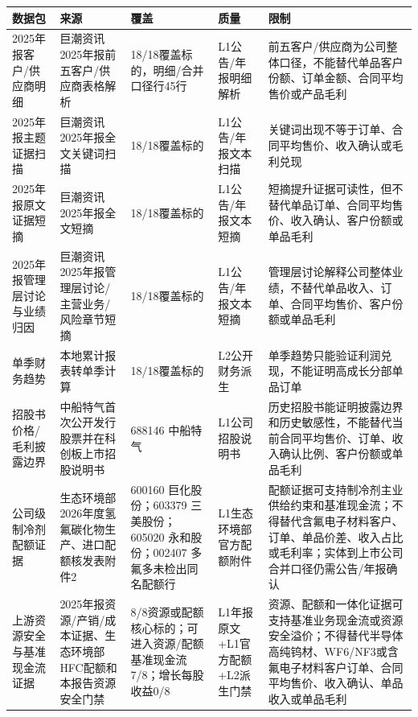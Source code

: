 \begin{exhibitbox}[结构化数据源健康（7）]
\scriptsize
\begin{tabularx}{\exhibitboxwidth}{L{2.1cm} L{2.4cm} L{2.4cm} L{1.5cm} X}
\toprule
\textbf{数据包} & \textbf{来源} & \textbf{覆盖} & \textbf{质量} & \textbf{限制} \\
\midrule
2025年报客户/供应商明细 & 巨潮资讯2025年报前五客户/供应商表格解析 & 18/18覆盖标的，明细/合并口径行45行 & L1公告/年报明细解析 & 前五客户/供应商为公司整体口径，不能替代单品客户份额、订单金额、合同平均售价或产品毛利 \\
2025年报主题证据扫描 & 巨潮资讯2025年报全文关键词扫描 & 18/18覆盖标的 & L1公告/年报文本扫描 & 关键词出现不等于订单、合同平均售价、收入确认或毛利兑现 \\
2025年报原文证据短摘 & 巨潮资讯2025年报全文短摘 & 18/18覆盖标的 & L1公告/年报文本短摘 & 短摘提升证据可读性，但不替代单品订单、合同平均售价、收入确认、客户份额或单品毛利 \\
2025年报管理层讨论与业绩归因 & 巨潮资讯2025年报管理层讨论/主营业务/风险章节短摘 & 18/18覆盖标的 & L1公告/年报文本短摘 & 管理层讨论解释公司整体业绩，不替代单品收入、订单、合同平均售价、客户份额或单品毛利 \\
单季财务趋势 & 本地累计报表转单季计算 & 18/18覆盖标的 & L2公开财务派生 & 单季趋势只能验证利润兑现，不能证明高成长分部单品订单 \\
招股书价格/毛利披露边界 & 中船特气首次公开发行股票并在科创板上市招股说明书 & 688146 中船特气 & L1公司招股说明书 & 历史招股书能证明披露边界和历史敏感性，不能替代当前合同平均售价、订单、收入确认比例、客户份额或单品毛利 \\
公司级制冷剂配额证据 & 生态环境部2026年度氢氟碳化物生产、进口配额核发表附件2 & 600160 巨化股份；603379 三美股份；605020 永和股份；002407 多氟多未检出同名配额行 & L1生态环境部官方配额附件 & 配额证据可支持制冷剂主业供给约束和基准现金流；不得替代含氟电子材料客户、订单、单品价差、收入占比或毛利率；实体到上市公司合并口径仍需公告/年报确认 \\
上游资源安全与基准现金流证据 & 2025年报资源/产销/成本证据、生态环境部HFC配额和本报告资源安全门禁 & 8/8资源或配额核心标的；可进入资源/配额基准现金流7/8；增长每股收益0/8 & L1年报原文+L1官方配额+L2派生门禁 & 资源、配额和一体化证据可支持基准业务现金流或资源安全溢价；不得替代半导体高纯钨材、WF6/NF3或含氟电子材料客户订单、合同平均售价、收入确认、单品收入或单品毛利 \\
\bottomrule
\end{tabularx}
\end{exhibitbox}

